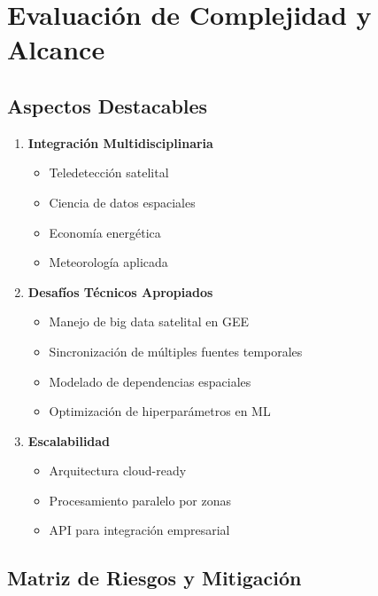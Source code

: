 \documentclass[12pt,a4paper]{article}
\begin{document}
\section{Evaluación de Complejidad y Alcance}

\subsection{Aspectos Destacables}

\begin{enumerate}
    \item \textbf{Integración Multidisciplinaria}
    \begin{itemize}
        \item Teledetección satelital
        \item Ciencia de datos espaciales
        \item Economía energética
        \item Meteorología aplicada
    \end{itemize}
    
    \item \textbf{Desafíos Técnicos Apropiados}
    \begin{itemize}
        \item Manejo de big data satelital en GEE
        \item Sincronización de múltiples fuentes temporales
        \item Modelado de dependencias espaciales
        \item Optimización de hiperparámetros en ML
    \end{itemize}
    
    \item \textbf{Escalabilidad}
    \begin{itemize}
        \item Arquitectura cloud-ready
        \item Procesamiento paralelo por zonas
        \item API para integración empresarial
    \end{itemize}
\end{enumerate}

\subsection{Matriz de Riesgos y Mitigación}
\end{document}
